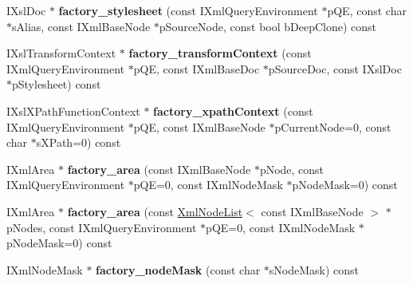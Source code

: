 \begin{DoxyCompactItemize}
\item 
\hypertarget{classgeneral__server_1_1LibXmlLibrary_af119cd862d8ba32972743de28450337d}{\-I\-Xsl\-Doc $\ast$ {\bfseries factory\-\_\-stylesheet} (const \-I\-Xml\-Query\-Environment $\ast$p\-Q\-E, const char $\ast$s\-Alias, const \-I\-Xml\-Base\-Node $\ast$p\-Source\-Node, const bool b\-Deep\-Clone) const }\label{classgeneral__server_1_1LibXmlLibrary_af119cd862d8ba32972743de28450337d}

\item 
\hypertarget{classgeneral__server_1_1LibXmlLibrary_aad7f66e037b444d0e6531273dd858c2f}{\-I\-Xsl\-Transform\-Context $\ast$ {\bfseries factory\-\_\-transform\-Context} (const \-I\-Xml\-Query\-Environment $\ast$p\-Q\-E, const \-I\-Xml\-Base\-Doc $\ast$p\-Source\-Doc, const \-I\-Xsl\-Doc $\ast$p\-Stylesheet) const }\label{classgeneral__server_1_1LibXmlLibrary_aad7f66e037b444d0e6531273dd858c2f}

\item 
\hypertarget{classgeneral__server_1_1LibXmlLibrary_a2e69aff4f98fd37d4dd12f91519a259e}{\-I\-Xsl\-X\-Path\-Function\-Context $\ast$ {\bfseries factory\-\_\-xpath\-Context} (const \-I\-Xml\-Query\-Environment $\ast$p\-Q\-E, const \-I\-Xml\-Base\-Node $\ast$p\-Current\-Node=0, const char $\ast$s\-X\-Path=0) const }\label{classgeneral__server_1_1LibXmlLibrary_a2e69aff4f98fd37d4dd12f91519a259e}

\item 
\hypertarget{classgeneral__server_1_1LibXmlLibrary_a1500c1a5eeaf18c3183378ab6e25caa1}{\-I\-Xml\-Area $\ast$ {\bfseries factory\-\_\-area} (const \-I\-Xml\-Base\-Node $\ast$p\-Node, const \-I\-Xml\-Query\-Environment $\ast$p\-Q\-E=0, const \-I\-Xml\-Node\-Mask $\ast$p\-Node\-Mask=0) const }\label{classgeneral__server_1_1LibXmlLibrary_a1500c1a5eeaf18c3183378ab6e25caa1}

\item 
\hypertarget{classgeneral__server_1_1LibXmlLibrary_a53d25ef1c96ef089e67e85c55af4d38d}{\-I\-Xml\-Area $\ast$ {\bfseries factory\-\_\-area} (const \hyperlink{classgeneral__server_1_1XmlNodeList}{\-Xml\-Node\-List}$<$ const \-I\-Xml\-Base\-Node $>$ $\ast$p\-Nodes, const \-I\-Xml\-Query\-Environment $\ast$p\-Q\-E=0, const \-I\-Xml\-Node\-Mask $\ast$p\-Node\-Mask=0) const }\label{classgeneral__server_1_1LibXmlLibrary_a53d25ef1c96ef089e67e85c55af4d38d}

\item 
\hypertarget{classgeneral__server_1_1LibXmlLibrary_a9f8c3c719c78a38a70268cf47a54d1e9}{\-I\-Xml\-Node\-Mask $\ast$ {\bfseries factory\-\_\-node\-Mask} (const char $\ast$s\-Node\-Mask) const }\label{classgeneral__server_1_1LibXmlLibrary_a9f8c3c719c78a38a70268cf47a54d1e9}

\end{DoxyCompactItemize}

